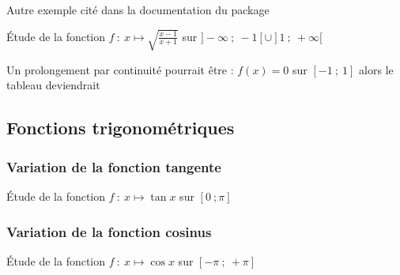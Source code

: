 Autre exemple  cité dans la documentation du package 

Étude de la fonction $f~:~ x \longmapsto \sqrt{\frac{x-1}{x+1}}$ sur $]-\infty~;~-1[\cup ]1~;~+\infty[$

\begin{tkzexample}
\end{tkzexample}

Un prolongement par continuité pourrait être : $f(x)=0$ sur $[-1~;~1]$ alors le tableau deviendrait

\begin{tkzexample}
\end{tkzexample}


\subsection{Fonctions trigonométriques}
 \subsubsection{Variation de la fonction tangente}
 Étude de la fonction $f~:~ x \longmapsto \tan{x}$ sur $[0~;\pi]$

 \begin{tkzexample}[vbox]
\end{tkzexample}

\subsubsection{Variation de la fonction cosinus}
  Étude de la fonction $f~:~ x \longmapsto \cos{x}$ sur $[-\pi~;~+\pi]$

